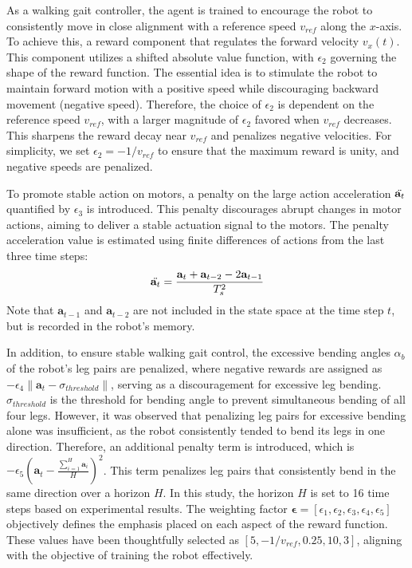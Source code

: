 As a walking gait controller, the agent is trained to encourage the robot to consistently move in close alignment with a reference speed $v_{ref}$ along the $x$-axis. To achieve this, a reward component that regulates the forward velocity $v_x(t)$. This component utilizes a shifted absolute value function, with $\epsilon_2$ governing the shape of the reward function. The essential idea  is to stimulate the robot to maintain forward motion with a positive speed while discouraging backward movement (negative speed). Therefore, the choice of $\epsilon_2$ is dependent on the reference speed $v_{ref}$, with a larger magnitude of $\epsilon_2$ favored when $v_{ref}$ decreases. This sharpens the reward decay near $v_{ref}$ and penalizes negative velocities. For simplicity, we set $\epsilon_2 = −1/v_{ref}$ to ensure that the maximum reward is unity, and negative speeds are penalized. 

To promote stable action on motors, a penalty on the large action acceleration $\Ddot{\mathbf{a}_t}$ quantified by $\epsilon_3$ is introduced. This penalty discourages abrupt changes in motor actions, aiming to deliver a stable actuation signal to the motors. The penalty acceleration value is estimated using finite differences of actions from the last three time steps: $$\Ddot{\mathbf{a}_t} = \frac{\mathbf{a}_t+\mathbf{a}_{t-2}-2\mathbf{a}_{t-1}}{T_s^2}$$ Note that $\mathbf{a}_{t-1}$ and $\mathbf{a}_{t-2}$ are not included in the state space at the time step $t$, but is recorded in the robot's memory.

In addition, to ensure stable walking gait control, the excessive bending angles $\alpha_b$ of the robot's leg pairs are penalized, where negative rewards are assigned as $- \epsilon_4\lVert\mathbf{a}_t-\sigma_{threshold}\rVert$, serving as a discouragement for excessive leg bending. $\sigma_{threshold}$ is the threshold for bending angle to prevent simultaneous bending of all four legs. However, it was observed that penalizing leg pairs for excessive bending alone was insufficient, as the robot consistently tended to bend its legs in one direction. Therefore, an additional penalty term is introduced, which is $ - \epsilon_5(\mathbf{a}_t-\frac{\sum_{i=1}^{H}\mathbf{a}_i}{H})^2$. This term penalizes leg pairs that consistently bend in the same direction over a horizon $H$. In this study, the horizon $H$ is set to 16 time steps based on experimental results. The weighting factor $\pmb{\epsilon} = [\epsilon_1, \epsilon_2, \epsilon_3, \epsilon_4, \epsilon_5]$ objectively defines the emphasis placed on each aspect of the reward function. These values have been thoughtfully selected as $[5, −1/v_{ref}, 0.25, 10, 3]$, aligning with the objective of training the robot effectively.


